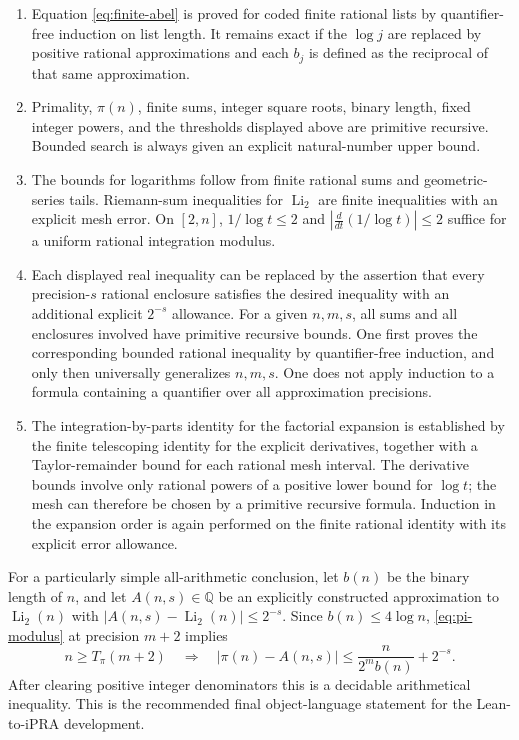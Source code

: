\begin{enumerate}
 \item Equation \eqref{eq:finite-abel} is proved for coded finite rational
 lists by quantifier-free induction on list length.  It remains exact if
 the $\log j$ are replaced by positive rational approximations and each
 $b_j$ is defined as the reciprocal of that same approximation.
 \item Primality, $\pi(n)$, finite sums, integer square roots, binary
 length, fixed integer powers, and the thresholds displayed above are
 primitive recursive.  Bounded search is always given an explicit
 natural-number upper bound.
 \item The bounds for logarithms follow from finite rational sums and
 geometric-series tails.  Riemann-sum inequalities for $\operatorname{Li}_2$
 are finite inequalities with an explicit mesh error.  On $[2,n]$,
 $1/\log t\le2$ and $|\frac{d}{dt}(1/\log t)|\le2$ suffice for a uniform
 rational integration modulus.
 \item Each displayed real inequality can be replaced by the assertion
 that every precision-$s$ rational enclosure satisfies the desired
 inequality with an additional explicit $2^{-s}$ allowance.
 For a given $n,m,s$, all sums and all enclosures involved have
 primitive recursive bounds.  One first proves the corresponding
 bounded rational inequality by quantifier-free induction, and only
 then universally generalizes $n,m,s$.  One does not apply induction
 to a formula containing a quantifier over all approximation precisions.
 \item The integration-by-parts identity for the factorial expansion is
 established by the finite telescoping identity for the explicit
 derivatives, together with a Taylor-remainder bound for each rational
 mesh interval.  The derivative bounds involve only rational powers
 of a positive lower bound for $\log t$; the mesh can therefore be
 chosen by a primitive recursive formula.  Induction in the expansion
 order is again performed on the finite rational identity with its
 explicit error allowance.
\end{enumerate}

For a particularly simple all-arithmetic conclusion, let $b(n)$ be the
binary length of $n$, and let $A(n,s)\in\mathbb Q$ be an explicitly
constructed approximation to $\operatorname{Li}_2(n)$ with
$|A(n,s)-\operatorname{Li}_2(n)|\le2^{-s}$.
Since $b(n)\le4\log n$, \eqref{eq:pi-modulus} at precision $m+2$ implies
\[
 n\ge T_\pi(m+2)\quad\Longrightarrow\quad
 |\pi(n)-A(n,s)|
       \le\frac{n}{2^m b(n)}+2^{-s}.
\]
After clearing positive integer denominators this is a decidable
arithmetical inequality.  This is the recommended final object-language
statement for the Lean-to-iPRA development.

